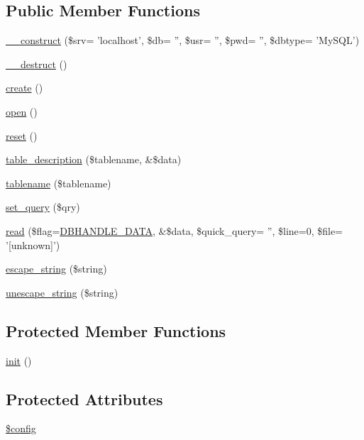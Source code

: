 \subsection*{Public Member Functions}
\begin{CompactItemize}
\item 
\hyperlink{classDbHandler_e54e9d4643f41a9296167086f6a769fc}{\_\-\_\-construct} (\$srv= 'localhost', \$db= '', \$usr= '', \$pwd= '', \$dbtype= 'MySQL')
\item 
\hyperlink{classDbHandler_7cd6bd727d1f296eb5dbfae6ca36ab3f}{\_\-\_\-destruct} ()
\item 
\hyperlink{classDbHandler_c9e93cb0ab57f03b2719eebd0c0ee2ef}{create} ()
\item 
\hyperlink{classDbHandler_fccbfc69ead84f8445116e050d1cfc2d}{open} ()
\item 
\hyperlink{classDbHandler_9982df4830f05803935bb31bac7fae3d}{reset} ()
\item 
\hyperlink{classDbHandler_00402b0e3e677108716714fbf94bea40}{table\_\-description} (\$tablename, \&\$data)
\item 
\hyperlink{classDbHandler_baca15a312800e5522b3efd9dff036f5}{tablename} (\$tablename)
\item 
\hyperlink{classDbHandler_305a3225c4760a88a06b0d55d0893962}{set\_\-query} (\$qry)
\item 
\hyperlink{classDbHandler_5ebfdc2acfcb0e9cbc2861fc55c7127c}{read} (\$flag=\hyperlink{class_8dbhandler_8php_cc5178c2a582eafa4ef488ed3394b725}{DBHANDLE\_\-DATA}, \&\$data, \$quick\_\-query= '', \$line=0, \$file= '\mbox{[}unknown\mbox{]}')
\item 
\hyperlink{classDbHandler_67d77702ff6db70f89123d3f947af143}{escape\_\-string} (\$string)
\item 
\hyperlink{classDbHandler_27c604b14c39913d34630e5504979b15}{unescape\_\-string} (\$string)
\end{CompactItemize}
\subsection*{Protected Member Functions}
\begin{CompactItemize}
\item 
\hyperlink{class__OWL_e0ef3ded56e8a6b34b6461e5a721cd3e}{init} ()
\end{CompactItemize}
\subsection*{Protected Attributes}
\begin{CompactItemize}
\item 
\hyperlink{class__OWL_f37a011667dda12fc417a68a6f3077d1}{\$config}
\end{CompactItemize}
